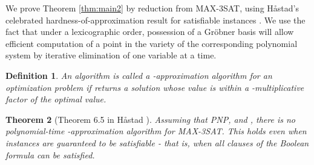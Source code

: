 \documentclass{article}
\newtheorem{thm}{Theorem}
\newtheorem{defn}[thm]{Definition}
\begin{document}
We prove Theorem \ref{thm:main2} by reduction from MAX-3SAT, using H{\aa}stad's celebrated hardness-of-approximation result for satisfiable instances \cite{hast01}.  We use the fact that under a lexicographic order, possession of a Gr\"obner basis  will allow efficient computation of a point in the variety of the corresponding polynomial system by iterative elimination of one variable at a time.

\begin{defn}
An algorithm  is called a \emph{\nobreakdash-approximation algorithm} for an optimization problem if  returns a solution whose value is within a -multiplicative factor of the optimal value.
\end{defn}

\begin{thm}[Theorem 6.5 in H{\aa}stad \cite{hast01}] \label{hastad}
Assuming that PNP, and , there is no polynomial-time -approximation algorithm for MAX-3SAT.  This holds even when instances are guaranteed to be satisfiable - that is, when \emph{all} clauses of the Boolean formula can be satisfied.
\end{thm}
\end{document}
